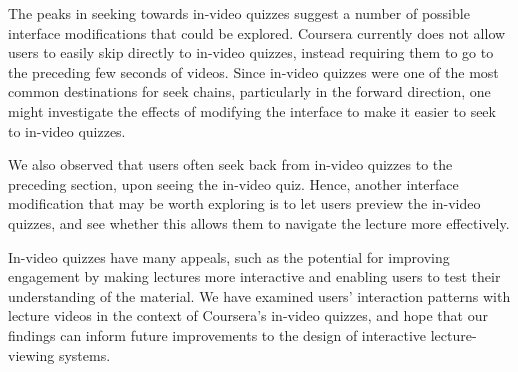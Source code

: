 \documentclass{sigchi}
\begin{document}


The peaks in seeking towards in-video quizzes suggest a number of possible interface modifications that could be explored. Coursera currently does not allow users to easily skip directly to in-video quizzes, instead requiring them to go to the preceding few seconds of videos. Since in-video quizzes were one of the most common destinations for seek chains, particularly in the forward direction, one might investigate the effects of modifying the interface to make it easier to seek to in-video quizzes.

We also observed that users often seek back from in-video quizzes to the preceding section, upon seeing the in-video quiz. Hence, another interface modification that may be worth exploring is to let users preview the in-video quizzes, and see whether this allows them to navigate the lecture more effectively. %

In-video quizzes have many appeals, such as the potential for improving engagement by making lectures more interactive and enabling users to test their understanding of the material. We have examined users' interaction patterns with lecture videos in the context of Coursera's in-video quizzes, and hope that our findings can inform future improvements to the design of interactive lecture-viewing systems.



\end{document}
